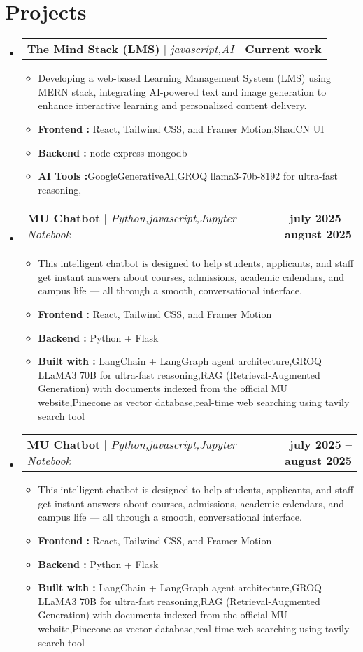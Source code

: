 \documentclass[letterpaper,11pt]{article}
\makeatletter
\newcommand{\resumeItem}[1]{\item\small{{#1 \vspace{-2pt}}}}
\newcommand{\resumeProjectHeading}[2]{
    \item
    \begin{tabular*}{1.001\textwidth}{l@{\extracolsep{\fill}}r}
      \small#1 & \textbf{\small #2}\\
    \end{tabular*}\vspace{-6pt}
}
\newcommand{\resumeItemListStart}{\begin{itemize}}
\newcommand{\resumeItemListEnd}{\end{itemize}\vspace{-5pt}}
\newcommand{\resumeSubHeadingListStart}{\begin{itemize}[leftmargin=0.0in, label={}]}
\newcommand{\resumeSubHeadingListEnd}{\end{itemize}}
\makeatother
\begin{document}
\section{Projects}
\resumeSubHeadingListStart
     \resumeProjectHeading
      {\textbf{The Mind Stack (LMS)} $|$ \emph{javascript,AI}}{Current work}
      \resumeItemListStart
        \resumeItem{Developing a web-based Learning Management System (LMS) using MERN stack, integrating AI-powered text and image generation to enhance interactive learning and personalized content delivery.}
        \resumeItem{\textbf{Frontend :} React, Tailwind CSS, and Framer Motion,ShadCN UI}
         \resumeItem{\textbf{Backend :} node express mongodb}
          \resumeItem{\textbf{AI Tools :}GoogleGenerativeAI,GROQ llama3-70b-8192 for ultra-fast reasoning,}
      \resumeItemListEnd
  \resumeProjectHeading
      {\textbf{MU Chatbot} $|$ \emph{Python,javascript,Jupyter Notebook }}{july 2025 -- august 2025}
      \resumeItemListStart
        \resumeItem{This intelligent chatbot is designed to help students, applicants, and staff get instant answers about courses, admissions, academic calendars, and campus life — all through a smooth, conversational interface.}
        \resumeItem{\textbf{Frontend :} React, Tailwind CSS, and Framer Motion}
         \resumeItem{\textbf{Backend :} Python + Flask}
          \resumeItem{\textbf{Built with :} LangChain + LangGraph agent architecture,GROQ LLaMA3 70B for ultra-fast reasoning,RAG (Retrieval-Augmented Generation) with documents indexed from the official MU website,Pinecone as vector database,real-time web searching using tavily search tool}
      \resumeItemListEnd
 \resumeProjectHeading
      {\textbf{MU Chatbot} $|$ \emph{Python,javascript,Jupyter Notebook }}{july 2025 -- august 2025}
      \resumeItemListStart
        \resumeItem{This intelligent chatbot is designed to help students, applicants, and staff get instant answers about courses, admissions, academic calendars, and campus life — all through a smooth, conversational interface.}
        \resumeItem{\textbf{Frontend :} React, Tailwind CSS, and Framer Motion}
         \resumeItem{\textbf{Backend :} Python + Flask}
          \resumeItem{\textbf{Built with :} LangChain + LangGraph agent architecture,GROQ LLaMA3 70B for ultra-fast reasoning,RAG (Retrieval-Augmented Generation) with documents indexed from the official MU website,Pinecone as vector database,real-time web searching using tavily search tool}
      \resumeItemListEnd
 
\resumeSubHeadingListEnd
\end{document}
